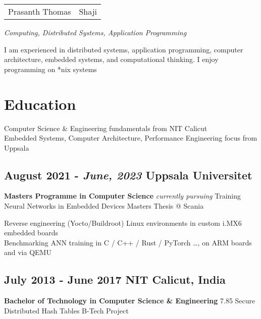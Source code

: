\documentclass{scrartcl}
\begin{document}
\newcommand{\hll}[1]{{\color{RawSienna}#1}}
\newcommand{\hlp}[1]{{\color{Maroon}#1}}

	\begin{center}
		\begin{tabular}{rl}
			\huge Prasanth Thomas & \huge Shaji
		\end{tabular}
	\end{center}

	\begin{center}
		\itshape Computing, Distributed Systems, Application Programming
	\end{center}

	\vfill

	I am experienced in distributed systems, application programming, computer architecture, embedded systems, and computational thinking. I enjoy programming on *nix systems

	\section{Education}

	Computer Science \& Engineering fundamentals from NIT Calicut \\
	Embedded Systems, Computer Architecture, Performance Engineering focus from Uppsala

		\subsection[Uppsala Universitet]{August 2021 - \textit{June, 2023} \hfill Uppsala Universitet}
		\textbf{\large Masters Programme in Computer Science} \hfill \textit{currently pursuing} \newline
		Training Neural Networks in Embedded Devices \hfill Masters Thesis @ Scania

		Reverse engineering (\hlp{Yocto}/\hlp{Buildroot}) Linux environments in custom i.MX6 embedded boards \\
		Benchmarking ANN training in \hll{C} / \hll{C++} / \hll{Rust} / \hlp{PyTorch} \dots, on \hlp{ARM} boards and via \hlp{QEMU}

		\subsection[NITC]{July 2013 - June 2017 \hfill NIT Calicut, India}
		\textbf{\large Bachelor of Technology in Computer Science \& Engineering} \hfill 7.85 \newline
		Secure Distributed Hash Tables \hfill B-Tech Project
\end{document}
